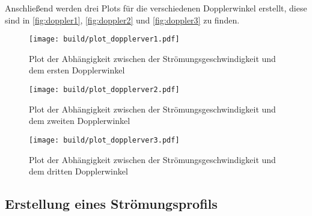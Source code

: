 Anschließend werden drei Plots für die verschiedenen Dopplerwinkel erstellt, diese sind in \autoref{fig:doppler1}, \autoref{fig:doppler2} und \autoref{fig:doppler3} zu finden.
\begin{figure}
    \centering
    \texttt{[image: build/plot\_dopplerver1.pdf]}
    \caption{Plot der Abhängigkeit zwischen der Strömungsgeschwindigkeit und dem ersten Dopplerwinkel}
    \label{fig:doppler1}
\end{figure}
\begin{figure}
    \centering
    \texttt{[image: build/plot\_dopplerver2.pdf]}
    \caption{Plot der Abhängigkeit zwischen der Strömungsgeschwindigkeit und dem zweiten Dopplerwinkel}
    \label{fig:doppler2}
\end{figure}
\begin{figure}
    \centering
    \texttt{[image: build/plot\_dopplerver3.pdf]}
    \caption{Plot der Abhängigkeit zwischen der Strömungsgeschwindigkeit und dem dritten Dopplerwinkel}
    \label{fig:doppler3}
\end{figure}

\subsection{Erstellung eines Strömungsprofils}
\label{ssec:aus2}

